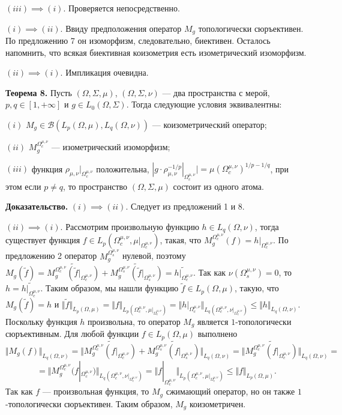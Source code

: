 \documentclass[11pt,twoside]{article}
\begin{document}
$(iii)$$\implies$$ (i)$. Проверяется непосредственно.

$(i)$$\implies$$ (ii)$. Ввиду предположения оператор $M_g$ топологически сюръективен. По предложению 7 он изоморфизм, следовательно, биективен. Осталось напомнить, что всякая биективная коизометрия есть изометрический изоморфизм.

$(ii)$$\implies$$ (i)$. Импликация очевидна.

\textbf{Теорема 8.} Пусть $(\Omega,\Sigma,\mu)$, $(\Omega,\Sigma,\nu)$ --- два пространства с мерой, $p,q\in[1,+\infty]$ и $g\in L_0(\Omega,\Sigma)$. Тогда следующие условия эквивалентны:

$(i)$ $M_g\in\mathcal{B}(L_p(\Omega,\mu), L_q(\Omega,\nu))$ --- коизометрический оператор;

$(ii)$ $M_g^{\Omega_c^{\mu,\nu}}$ --- изометрический изоморфизм;

$(iii)$ функция $\rho_{\mu,\nu}|_{\Omega_c^{\mu,\nu}}$ положительна, $|g\cdot\rho_{\mu,\nu}^{-1/p}|_{\Omega_c^{\mu,\nu}}|=\mu(\Omega_c^{\mu,\nu})^{1/p-1/q}$, при этом если $p\neq q$, то пространство $(\Omega,\Sigma,\mu)$ состоит из одного атома.

\textbf{Доказательство.} $(i)$$\implies$$ (ii)$. Следует из предложений 1 и 8.

$(ii)$$\implies$$ (i)$. Рассмотрим произвольную функцию $h\in L_q(\Omega,\nu)$, тогда существует функция $f\in L_p(\Omega_c^{\mu,\nu},\mu|_{\Omega_c^{\mu,\nu}})$, такая, что $M_g^{\Omega_c^{\mu,\nu}}(f)=h|_{\Omega_c^{\mu,\nu}}$. По предложению 2 оператор $M_g^{\Omega_s^{\mu,\nu}}$ нулевой, поэтому
$M_g(\widetilde{f})
=\widetilde{M_g^{\Omega_c^{\mu,\nu}}(\widetilde{f}|_{\Omega_c^{\mu,\nu}})}+\widetilde{M_g^{\Omega_s^{\mu,\nu}}(\widetilde{f}|_{\Omega_s^{\mu,\nu}})}
=\widetilde{h|_{\Omega_c^{\mu,\nu}}}$.
Так как $\nu(\Omega_s^{\mu,\nu})=0$, то $h=\widetilde{h|_{\Omega_c^{\mu,\nu}}}$. Таким образом, мы нашли функцию $\widetilde{f}\in L_p(\Omega,\mu)$, такую, что $M_g(\widetilde{f})=h$ и $\Vert \widetilde{f}\Vert_{L_p(\Omega,\mu)}=\Vert f\Vert_{L_p(\Omega_c^{\mu,\nu},\mu|_{\Omega_c^{\mu,\nu}})}=\Vert h|_{\Omega_c^{\mu,\nu}}\Vert_{L_q(\Omega_c^{\mu,\nu},\nu|_{\Omega_c^{\mu,\nu}})}\leq\Vert h\Vert_{L_q(\Omega,\nu)}$. Поскольку функция $h$ произвольна, то оператор $M_g$ является $1$-топологически сюръективным. Для любой функции $f\in L_p(\Omega,\mu)$ выполнено 
$$
\Vert M_g(f)\Vert_{L_q(\Omega,\nu)}
=\Vert\widetilde{M_g^{\Omega_c^{\mu,\nu}}(f|_{\Omega_c^{\mu,\nu}})}+\widetilde{M_g^{\Omega_s^{\mu,\nu}}(f|_{\Omega_s^{\mu,\nu}})}\Vert_{L_q(\Omega,\nu)}
=\Vert\widetilde{M_g^{\Omega_c^{\mu,\nu}}
(f|_{\Omega_c^{\mu,\nu}})}\Vert_{L_q(\Omega,\nu)}=
$$
$$
=\Vert M_g^{\Omega_c^{\mu,\nu}}(f|_{\Omega_c^{\mu,\nu}})\Vert_{L_q(\Omega_c^{\mu,\nu},\nu|_{\Omega_c^{\mu,\nu}})}
=\Vert f|_{\Omega_c^{\mu,\nu}}\Vert_{L_p(\Omega_c^{\mu,\nu},\mu|_{\Omega_c^{\mu,\nu}})}
\leq\Vert f \Vert_{L_p(\Omega,\mu)}.
$$ 
Так как $f$ --- произвольная функция, то $M_g$ сжимающий оператор, но он также $1$-топологически сюръективен. Таким образом, $M_g$ коизометричен.
\end{document}
